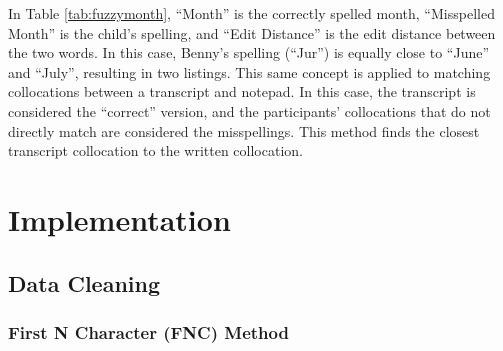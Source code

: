 \documentclass[print]{nuthesis}
\begin{document}
In Table \ref{tab:fuzzymonth}, ``Month'' is the correctly spelled month, ``Misspelled Month'' is the child's spelling, and ``Edit Distance'' is the edit distance between the two words.
In this case, Benny's spelling (``Jur'') is equally close to ``June'' and ``July'', resulting in two listings.
This same concept is applied to matching collocations between a transcript and notepad.
In this case, the transcript is considered the ``correct'' version, and the participants' collocations that do not directly match are considered the misspellings.
This method finds the closest transcript collocation to the written collocation.

\hypertarget{implementation}{%
\section{Implementation}\label{implementation}}

\hypertarget{data-cleaning}{%
\subsection{Data Cleaning}\label{data-cleaning}}

\hypertarget{first-n-character-fnc-method}{%
\subsubsection{First N Character (FNC) Method}\label{first-n-character-fnc-method}}
\end{document}
